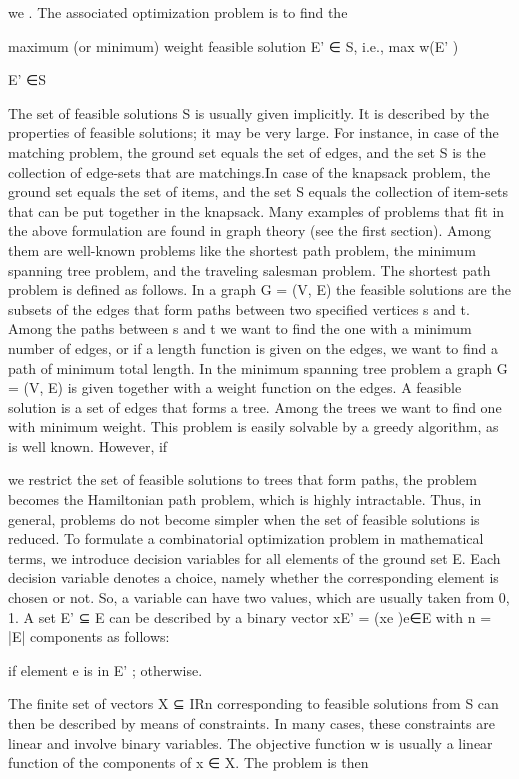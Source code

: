\documentclass[titlepage]{book}
\begin{document}

we . The associated optimization problem is to find the

maximum (or minimum) weight feasible solution E' ∈ S, i.e.,
max {w(E' )}

E' ∈S

The set of feasible solutions S is usually given implicitly. It is described by the properties of feasible
solutions; it may be very large. For instance, in case of the matching problem, the ground set equals
the set of edges, and the set S is the collection of edge-sets that are matchings.In case of the knapsack
problem, the ground set equals the set of items, and the set S equals the collection of item-sets that can
be put together in the knapsack.
Many examples of problems that fit in the above formulation are found in graph theory (see the first
section). Among them are well-known problems like the shortest path problem, the minimum spanning
tree problem, and the traveling salesman problem. The shortest path problem is defined as follows. In a
graph G = (V, E) the feasible solutions are the subsets of the edges that form paths between two specified
vertices s and t. Among the paths between s and t we want to find the one with a minimum number of
edges, or if a length function is given on the edges, we want to find a path of minimum total length. In
the minimum spanning tree problem a graph G = (V, E) is given together with a weight function on the
edges. A feasible solution is a set of edges that forms a tree. Among the trees we want to find one with
minimum weight. This problem is easily solvable by a greedy algorithm, as is well known. However, if

we restrict the set of feasible solutions to trees that form paths, the problem becomes the Hamiltonian
path problem, which is highly intractable. Thus, in general, problems do not become simpler when the
set of feasible solutions is reduced.
To formulate a combinatorial optimization problem in mathematical terms, we introduce decision variables for all elements of the ground set E. Each decision variable denotes a choice, namely whether the
corresponding element is chosen or not. So, a variable can have two values, which are usually taken from
{0, 1}. A set E' ⊆ E can be described by a binary vector xE' = (xe )e∈E with n = |E| components as
follows:


if element e is in E' ;
otherwise.

The finite set of vectors X ⊆ IRn corresponding to feasible solutions from S can then be described by
means of constraints. In many cases, these constraints are linear and involve binary variables. The
objective function w is usually a linear function of the components of x ∈ X. The problem is then
\end{document}

